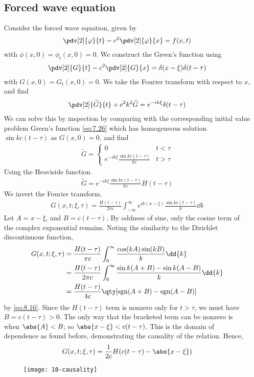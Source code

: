 \subsection{Forced wave equation}
Consider the forced wave equation, given by
\begin{align} \label{eq:10.10}
	\pdv[2]{\phi}{t} - c^2 \pdv[2]{\phi}{x} = f(x,t)
\end{align}
with $\phi(x,0) = \phi_t(x,0) = 0$.
We construct the Green's function using
\begin{align*}
	\pdv[2]{G}{t} - c^2 \pdv[2]{G}{x} = \delta(x-\xi)\delta(t-\tau)
\end{align*}
with $G(x,0) = G_t(x,0) = 0$.
We take the Fourier transform with respect to $x$, and find
\begin{align*}
	\pdv[2]{\widetilde G}{t} + c^2 k^2 \widetilde G = e^{-ik\xi} \delta(t - \tau)
\end{align*}
We can solve this by inspection by comparing with the corresponding initial value problem Green's function \cref{eq:7.26} which has homogeneous solution $\sin kc (t - \tau)$ as $G(x,0) = 0$, and find
\begin{align*}
	\widetilde G = \begin{cases}
		0                                       & t < \tau \\
		e^{-ik\xi} \frac{\sin kc(t - \tau)}{kc} & t > \tau
	\end{cases}
\end{align*}
Using the Heaviside function.
\begin{align*}
	\widetilde G = e^{-ik\xi} \frac{\sin kc(t - \tau)}{kc} H(t - \tau)
\end{align*}
We invert the Fourier transform.
\begin{align*}
	G(x,t;\xi,\tau) = \frac{H(t-\tau)}{2\pi c} \int_{-\infty}^\infty e^{ik(x - \xi)} \frac{\sin kc(t - \tau)}{k} \dd{k}
\end{align*}
Let $A = x - \xi$, and $B = c(t - \tau)$.
By oddness of sine, only the cosine term of the complex exponential remains.
Noting the similarity to the Dirichlet discontinuous function,
\begin{align*}
	G(x,t;\xi,\tau) & = \frac{H(t-\tau)}{\pi c} \int_0^\infty \frac{\cos(kA) \sin(kB)}{k} \dd{k} \\
	& = \frac{H(t-\tau)}{2\pi c} \int_0^\infty \frac{\sin k(A+B) - \sin k(A-B)}{k} \dd{k} \\
	& = \frac{H(t-\tau)}{4c} \qty[ \sgn(A+B) - \sgn(A-B) ]
\end{align*}
by \cref{eq:8.16}.
Since the $H(t - \tau)$ term is nonzero only for $t > \tau$, we must have $B = c(t-\tau) > 0$.
The only way that the bracketed term can be nonzero is when $\abs{A} < B$; so $\abs{x - \xi} < c(t-\tau)$.
This is the domain of dependence as found before, demonstrating the causality of the relation.
Hence,
\begin{align} \label{eq:10.11}
	G(x,t;\xi,\tau) = \frac{1}{2c} H(c(t-\tau) - \abs{x - \xi})
\end{align}
\begin{figure}[h] 
    \centering 
    \texttt{[image: 10-causality]} 
\end{figure}

